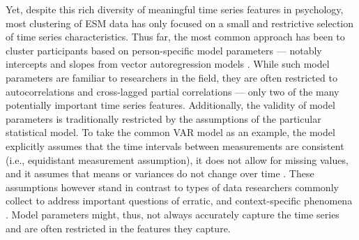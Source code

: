 \documentclass[man, 12pt, a4paper, mask, floatsintext]{apa7}
\theoremstyle{break}
\theoremstyle{plain}
\begin{document}
Yet, despite this rich diversity of meaningful time series features in psychology, most clustering of ESM data has only focused on a small and restrictive selection of time series characteristics. Thus far, the most common approach has been to cluster participants based on person-specific model parameters --- notably intercepts and slopes from vector autoregression models \citep[VAR; e.g.,][]{ariens2020, bulteel2016, stefanovic2022}. While such model parameters are familiar to researchers in the field, they are often restricted to autocorrelations and cross-lagged partial correlations \citep[e.g.,][]{bringmann2018c} --- only two of the many potentially important time series features. Additionally, the validity of model parameters is traditionally restricted by the assumptions of the particular statistical model. To take the common VAR model as an example, the model explicitly assumes that the time intervals between measurements are consistent (i.e., equidistant measurement assumption), it does not allow for missing values, and it assumes that means or variances do not change over time \citep[i.e., stationarity assumption;][]{lutkepohl2005}. These assumptions however stand in contrast to types of data researchers commonly collect to address important questions of erratic, and context-specific phenomena \citep[][]{myin-germeys2018, hamaker2017, kivela2022, helmich2020a}. Model parameters might, thus, not always accurately capture the time series and are often restricted in the features they capture.


\end{document}
